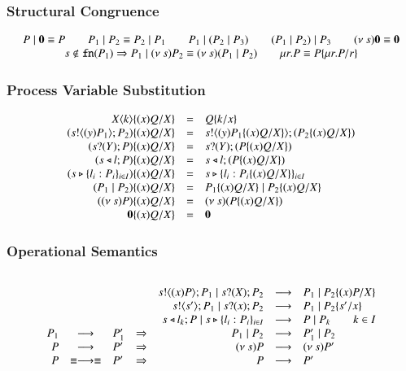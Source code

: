 \subsubsection{Structural Congruence}
\[
	\begin{array}{c}
		P \;|\; \mathbf{0} \equiv P \qquad P_1 \;|\; P_2 \equiv P_2 \;|\; P_1 \qquad P_1 \;|\; (P_2 \;|\; P_3)
		\qquad (P_1 \;|\; P_2) \;|\; P_3 \qquad (\nu\ s) \mathbf{0} \equiv \mathbf{0}\\
		s \notin \mathtt{fn}(P_1) \Rightarrow P_1 \;|\; (\nu\ s) P_2 \equiv (\nu\ s)(P_1 \;|\; P_2)
		\qquad \mu r. P \equiv P\{\mu r. P/r \}
	\end{array}
\]

\subsubsection{Process Variable Substitution}
\[
	\begin{array}{rclcrcl}
			X\langle k \rangle \{(x)Q/X \} & = & Q \{k/x \} \\
		(s ! \langle (y)P_1 \rangle ; P_2) \{(x)Q/X \} &=& s ! \langle (y)P_1 \{(x)Q/X \} \rangle ; (P_2 \{(x)Q/X \}) \\
		(s ? (Y) ; P) \{(x)Q/X \} &=& s ? (Y) ; (P \{(x)Q/X \}) \\
		(s \triangleleft l ; P) \{(x)Q/X \} &=& s \triangleleft l ; (P \{(x)Q/X \})\\
		(s \triangleright \{l_i : P_i\}_{i \in I}) \{(x)Q/X \} &=& s \triangleright \{l_i : P_i \{(x)Q/X \}\}_{i \in I}\\
		(P_1 \;|\; P_2) \{(x)Q/X \} & = & P_1 \{(x)Q/X \} \;|\; P_2 \{(x)Q/X \}\\
		((\nu\ s) P) \{(x)Q/X \} & = & (\nu\ s) (P \{(x)Q/X \})\\
		\mathbf{0} \{(x)Q/X \} & = & \mathbf{0}
	\end{array}
\]

\subsubsection{Operational Semantics}
\[
	\begin{array}{rcl}
	\end{array}
\]
\[
	\begin{array}{rclcrcl}
		&& && s ! \langle (x)P \rangle ; P_1 \;|\; s ? (X) ; P_2 &\longrightarrow& P_1 \;|\; P_2 \{(x)P/X \} \\
		&& && s ! \langle s' \rangle ; P_1 \;|\; s ? (x) ; P_2 &\longrightarrow& P_1 \;|\; P_2 \{s'/x \}\\
		&& && s \triangleleft l_k ; P \;|\; s \triangleright \{l_i : P_i\}_{i \in I} &\longrightarrow& P \;|\; P_k \qquad k \in I \\
		P_1 &\longrightarrow& P_1' &\Rightarrow& P_1 \;|\; P_2 &\longrightarrow& P_1' \;|\; P_2\\
		P &\longrightarrow& P' &\Rightarrow& (\nu\ s) P &\longrightarrow& (\nu\ s) P'\\
		P &\equiv \longrightarrow \equiv& P'&\Rightarrow& P &\longrightarrow& P' 		
	\end{array}
\]

